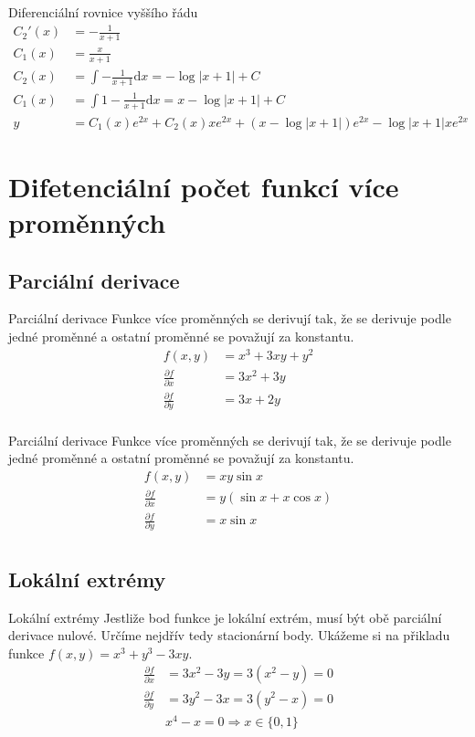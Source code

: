\documentclass{beamer}
\theoremstyle{definition}
\theoremstyle{example}
\def\d{\mathrm{d}}
\begin{document}
\begin{frame}{Diferenciální rovnice vyššího řádu}
	\begin{align*}
		C_2'(x) &= -\frac{1}{x + 1}\\
		C_1(x) &= \frac{x}{x + 1}\\
		C_2(x) &= \int -\frac{1}{x + 1} \d x = -\log |x + 1| + C\\
		C_1(x) &= \int 1 -\frac{1}{x + 1} \d x = x -\log |x + 1| + C\\
		y &= C_1(x)e^{2x} + C_2(x)xe^{2x} + (x -\log |x + 1|)e^{2x} - \log |x + 1| xe^{2x}
	\end{align*}
\end{frame}

\section{Difetenciální počet funkcí více proměnných}
\subsection{Parciální derivace}
\begin{frame}{Parciální derivace}
	Funkce více proměnných se derivují tak, že se derivuje podle jedné proměnné a ostatní proměnné se považují za konstantu.
	\begin{align*}
		f(x, y) &= x^3 + 3xy + y^2\\
		\frac{\partial f}{\partial x} &= 3x^2 + 3y\\
		\frac{\partial f}{\partial y} &= 3x + 2y\\
	\end{align*}
\end{frame}

\begin{frame}{Parciální derivace}
	Funkce více proměnných se derivují tak, že se derivuje podle jedné proměnné a ostatní proměnné se považují za konstantu.
	\begin{align*}
		f(x, y) &= xy\sin x \\
		\frac{\partial f}{\partial x} &= y(\sin x + x \cos x)\\
		\frac{\partial f}{\partial y} &= x \sin x\\
	\end{align*}
\end{frame}

\subsection{Lokální extrémy}
\begin{frame}{Lokální extrémy}
	Jestliže bod funkce je lokální extrém, musí být obě parciální derivace nulové. Určíme nejdřív tedy stacionární body. Ukážeme si na přikladu funkce $f(x, y) = x^3 + y^3 - 3xy$.
	\begin{align*}
		\frac{\partial f}{\partial x} &= 3x^2 - 3y = 3(x^2 - y) = 0\\
		\frac{\partial f}{\partial y} &= 3y^2 - 3x = 3(y^2 - x) = 0\\
		&x^4 - x = 0  \Rightarrow x \in \{0, 1\}
	\end{align*}
\end{frame}
\end{document}
